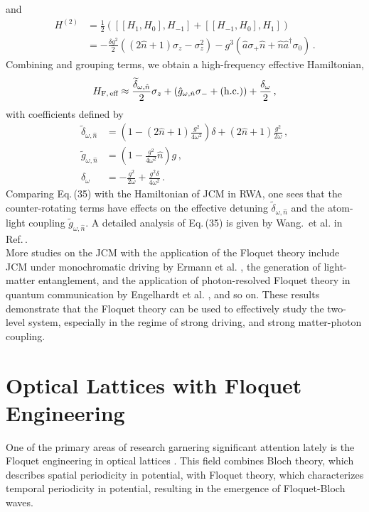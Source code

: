 \documentclass[reprint, amsmath, amssymb, aps]{revtex4-2}
\newcommand{\that}[1]{\widetilde{#1}}
\begin{document}
and 
\begin{align*}
H^{(2)} &= \frac{1}{2}\left( [[H_1,H_0], H_{-1}] + [[H_{-1},H_0], H_1]\right)\\
&=-\frac{\delta g^2}{2}\left( (2\hat{n}+1) \sigma_z - \sigma_z^2\right) - g^3\left( \hat{a}\sigma_+ \hat{n} + \hat{n}\hat{a}^\dagger \sigma_0\right)\,. \tag{36}
\end{align*}
Combining and grouping terms, we obtain a high-frequency effective Hamiltonian,
\begin{align}
H_{\text{F,\,eff}} \approx 
\frac{\that{\delta}_{\omega, \hat{n}}}{2} \sigma_z + \left( \hat{g}_{\omega, \hat{n}} \sigma_- + (\text{h.c.})\right) + \frac{\delta_{\omega}}{2}\,,
\end{align}
with coefficients defined by
\begin{align}
\that{\delta}_{\omega, \hat{n}} &=
\left(1- (2\hat{n}+1)\frac{g^2}{4\omega^2} \right)\delta + (2\hat{n}+1) \frac{g^2}{2\omega}\,, \\
\that{g}_{\omega, \hat{n}} &= \left(1 - \frac{g^2}{4\omega^2}\hat{n}  \right)g\,,\\
\delta_{\omega} &= -\frac{g^2}{2\omega} + \frac{g^2\delta}{4\omega^2}\,.
\end{align}
Comparing Eq.\,(35) with the Hamiltonian of JCM in RWA, one sees that the counter-rotating terms have effects on the effective detuning $\that{\delta}_{\omega, \hat{n}}$ and the atom-light coupling $\that{g}_{\omega, \hat{n}}$. A detailed analysis of Eq.\,(35) is given by Wang.\, et al. in Ref.\,\cite{Wang}.\\

More studies on the JCM with the application of the Floquet theory include JCM under monochromatic driving by Ermann et al. \cite{Ermann}, the generation of light-matter entanglement, and the application of photon-resolved Floquet theory in quantum communication by Engelhardt et al. \cite{Engelhardt}, and so on. These results demonstrate that the Floquet theory can be used to effectively study the two-level system, especially in the regime of strong driving, and strong matter-photon coupling. \\


\section{Optical Lattices with Floquet Engineering}
One of the primary areas of research garnering significant attention lately is the Floquet engineering in optical lattices \cite{Sandholzer, Subhankar, Wu, Sandholzer2}. This field combines Bloch theory, which describes spatial periodicity in potential, with Floquet theory, which characterizes temporal periodicity in potential, resulting in the emergence of Floquet-Bloch waves.\\
\end{document}
